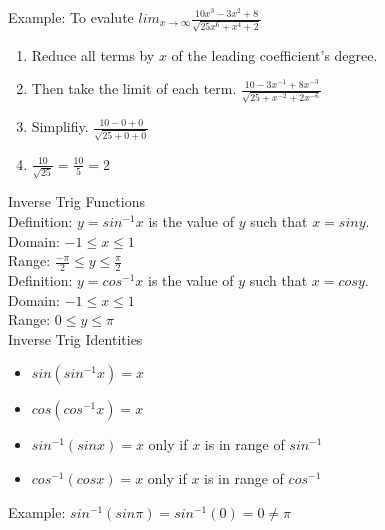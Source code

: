 \documentclass{article}
\begin{document}
\noindent
Example: To evalute $lim_{x \to \infty}\frac{10x^3 - 3x^2 + 8}{\sqrt{25x^6 + x^4 + 2}}$
\begin{enumerate}
  \item {Reduce all terms by $x$ of the leading coefficient's degree.}
  \item {Then take the limit of each term. $\frac{10 - 3x^{-1} + 8x^{-3}}{\sqrt{25 + x^{-2} + 2x^{-6}}}$}
  \item {Simplifiy. $\frac{10 - 0 + 0}{\sqrt{25 + 0 + 0}}$}
  \item {$\frac{10}{\sqrt{25}} = \frac{10}{5} = 2$}
\end{enumerate}

\noindent
\Large Inverse Trig Functions\\
\normalsize
\noindent
Definition: $y = sin^{-1}x$ is the value of $y$ such that $x = siny$.\\
\indent
Domain: $-1 \leq x \leq 1$\\
\indent
Range: $\frac{-\pi}{2} \leq y \leq \frac{\pi}{2}$\\

\noindent
Definition: $y = cos^{-1}x$ is the value of $y$ such that $x = cosy$.\\
\indent
Domain: $-1 \leq x \leq 1$\\
\indent
Range: $0 \leq y \leq \pi$\\

\noindent
\Large Inverse Trig Identities
\normalsize
\noindent
\begin{itemize}
  \item $sin(sin^{-1}x) = x$
  \item $cos(cos^{-1}x) = x$
  \item $sin^{-1}(sinx) = x$ only if $x$ is in range of $sin^{-1}$
  \item $cos^{-1}(cosx) = x$ only if $x$ is in range of $cos^{-1}$
\end{itemize}

\noindent
Example: $sin^{-1}(sin\pi) = sin^{-1}(0) = 0 \neq \pi$\\
\end{document}
